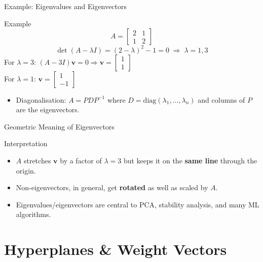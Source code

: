 \documentclass[9pt,aspectratio=169]{beamer}
\newcommand{\vect}[1]{\mathbf{#1}}
\begin{document}
\begin{frame}{Example: Eigenvalues and Eigenvectors}
\begin{exampleblock}{Example}
$$A = \begin{bmatrix}2&1\\1&2\end{bmatrix}$$
$$\det(A-\lambda I) = (2-\lambda)^2 - 1 = 0 \;\Rightarrow\; \lambda = 1, 3$$
For $\lambda=3$: $(A-3I)\vect{v}=0 \Rightarrow \vect{v} = \begin{bmatrix}1\\1\end{bmatrix}$ \\
For $\lambda=1$: $\vect{v} = \begin{bmatrix}1\\-1\end{bmatrix}$
\end{exampleblock}
\begin{itemize}
\item Diagonalisation: $A = PDP^{-1}$ where $D=\text{diag}(\lambda_1,\dots,\lambda_n)$ and columns of $P$ are the eigenvectors.
\end{itemize}
\end{frame}

\begin{frame}{Geometric Meaning of Eigenvectors}
\centering
{}
\begin{block}{Interpretation}
\begin{itemize}
\item $A$ stretches $\vect{v}$ by a factor of $\lambda = 3$ but keeps it on the \textbf{same line} through the origin.
\item Non-eigenvectors, in general, get \textbf{rotated} as well as scaled by $A$.
\item Eigenvalues/eigenvectors are central to PCA, stability analysis, and many ML algorithms.
\end{itemize}
\end{block}
\end{frame}

\section{Hyperplanes \& Weight Vectors}
\end{document}
